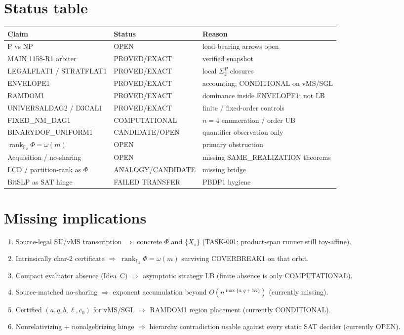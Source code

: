 \documentclass[11pt]{article}
\begin{document}
\section*{Status table}
\begin{tabular}{lll}
\toprule
Claim & Status & Reason \\
\midrule
P vs NP & OPEN & load-bearing arrows open \\
MAIN 1158-R1 arbiter & PROVED/EXACT & verified snapshot \\
LEGALFLAT1 / STRATFLAT1 & PROVED/EXACT & local $\Sigma_2^P$ closures \\
ENVELOPE1 & PROVED/EXACT & accounting; CONDITIONAL on vMS/SGL \\
RAMDOM1 & PROVED/EXACT & dominance inside ENVELOPE1; not LB \\
UNIVERSALDAG2 / D3CAL1 & PROVED/EXACT & finite / fixed-order controls \\
FIXED\_NM\_DAG1 & COMPUTATIONAL & $n{=}4$ enumeration / order UB \\
BINARYDOF\_UNIFORM1 & CANDIDATE/OPEN & quantifier observation only \\
$\operatorname{rank}_{\mathbb F_2}\Phi=\omega(m)$ & OPEN & primary obstruction \\
Acquisition / no-sharing & OPEN & missing SAME\_REALIZATION theorems \\
LCD / partition-rank as $\Phi$ & ANALOGY/CANDIDATE & missing bridge \\
BitSLP as SAT hinge & FAILED TRANSFER & PBDP1 hygiene \\
\bottomrule
\end{tabular}

\section*{Missing implications}
\begin{enumerate}
\item Source-legal SU/vMS transcription $\Rightarrow$ concrete $\Phi$ and $\{X_s\}$
(TASK-001; product-span runner still toy-affine).
\item Intrinsically char-$2$ certificate $\Rightarrow$ $\operatorname{rank}_{\mathbb F_2}\Phi=\omega(m)$
surviving COVERBREAK1 on that orbit.
\item Compact evaluator absence (Idea~C) $\Rightarrow$ asymptotic strategy LB
(finite absence is only COMPUTATIONAL).
\item Source-matched no-sharing $\Rightarrow$ exponent accumulation beyond
$O(n^{\max\{a,q+bK\}})$ (currently missing).
\item Certified $(a,q,b,\ell,c_0)$ for vMS/SGL $\Rightarrow$ RAMDOM1 region placement
(currently CONDITIONAL).
\item Nonrelativizing + nonalgebrizing hinge $\Rightarrow$ hierarchy contradiction
usable against every static SAT decider (currently OPEN).
\end{enumerate}
\end{document}
